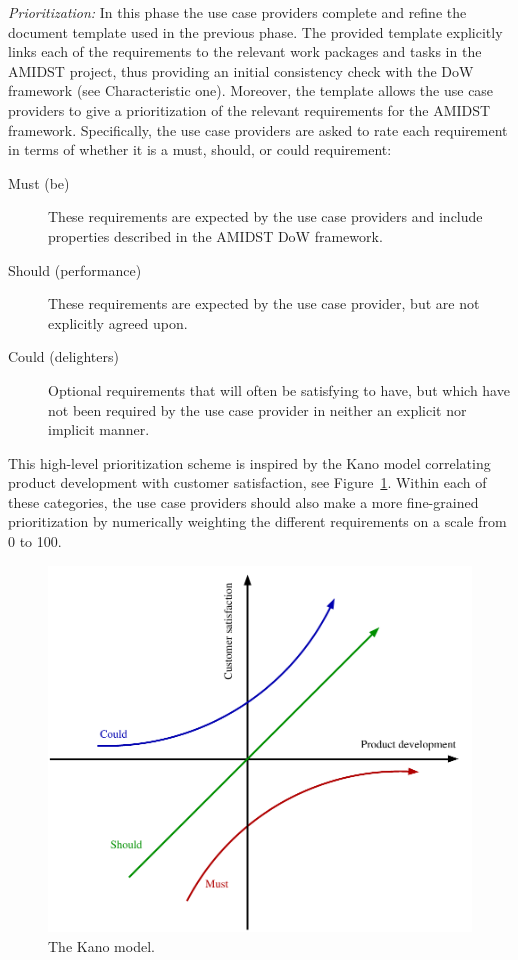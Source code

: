  \emph{Prioritization:} In this phase the use case providers complete and refine  the document template used in the
 previous phase. The provided template explicitly links each of the requirements to the relevant work packages and tasks in 
the
 AMIDST project, thus providing an initial consistency check with the DoW framework (see Characteristic one). Moreover, 
the template allows the use case providers to give
 a prioritization of the relevant requirements for the AMIDST framework.  Specifically, the use case
 providers are asked to rate each requirement in terms of whether it is a must, should, or could requirement:
\begin{description}
\item[Must (be)] These requirements are expected by the use case providers and include properties described in the 
AMIDST DoW framework.
\item[Should (performance)] These requirements are expected by the use case provider, but are not explicitly agreed upon.
\item[Could (delighters)] Optional requirements that will often be satisfying to have, but which have not been required
  by the use case provider in neither an explicit nor implicit manner.
\end{description}
 This high-level prioritization scheme is inspired by the Kano model
 correlating product development with customer satisfaction, see Figure~\ref{fig:kano}. Within each of these categories, the
 use case providers should also make a more fine-grained prioritization by numerically weighting the different
 requirements on a scale from 0 to 100. 

\begin{figure}[htbp]
  \centering
  \includegraphics[width=0.7\linewidth]{kano}
  \caption{The Kano model.}
  \label{fig:kano}
\end{figure}


